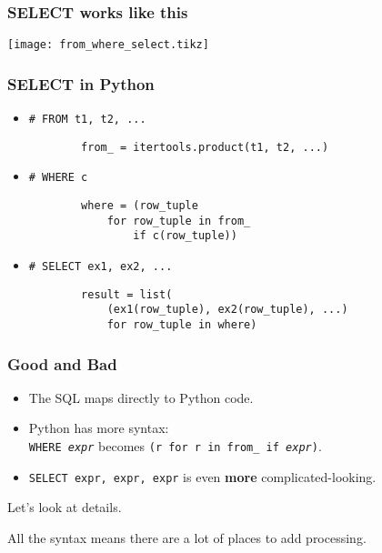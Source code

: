 \documentclass{beamer}
\begin{document}
\begin{frame}
    \frametitle{SELECT works like this}

    \begin{center}
    \texttt{[image: from\_where\_select.tikz]}
    \end{center}

\end{frame}

\begin{frame}[fragile]
    \frametitle{SELECT in Python}

    \begin{itemize}
    \item[]
        \texttt{\# FROM t1, t2, ...}

        \begin{verbatim}
        from_ = itertools.product(t1, t2, ...)
        \end{verbatim}

        \vspace{1em}
    \item[]
        \texttt{\# WHERE c}

        \begin{verbatim}
        where = (row_tuple
            for row_tuple in from_
                if c(row_tuple))
        \end{verbatim}

        \vspace{1em}
    \item[]
        \texttt{\# SELECT ex1, ex2, ...}

        \begin{verbatim}
        result = list(
            (ex1(row_tuple), ex2(row_tuple), ...)
            for row_tuple in where)
        \end{verbatim}

    \end{itemize}

\end{frame}

\begin{frame}
    \frametitle{Good and Bad}

    \begin{itemize}
    \item The SQL maps directly to Python code.

    \item Python has more syntax: \\ \texttt{WHERE \textit{expr}} becomes \texttt{(r for r in from\_ if \textit{expr})}.

    \item \texttt{SELECT expr, expr, expr} is even \textbf{more} complicated-looking.
    \end{itemize}

    \vspace{1em}
    Let's look at details.

    All the syntax means there are a lot of places to add processing.
\end{frame}
\end{document}
